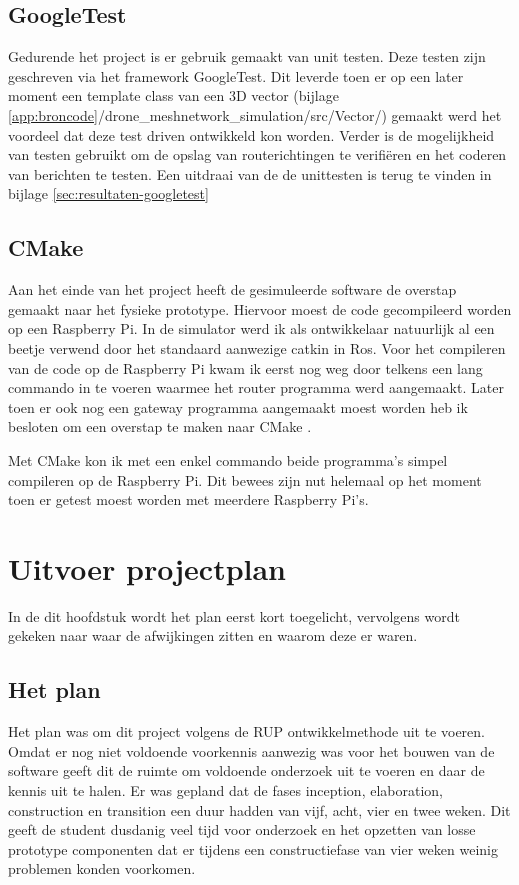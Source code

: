 \documentclass[a4paper, 11pt, oneside]{report}
\begin{document}
\section{GoogleTest}

Gedurende het project is er gebruik gemaakt van unit testen. 
Deze testen zijn geschreven via het framework GoogleTest.
Dit leverde toen er op een later moment een template class van een 3D vector (bijlage \ref{app:broncode}/drone\_meshnetwork\_simulation/src/Vector/) gemaakt werd het voordeel dat deze test driven ontwikkeld kon worden.  
Verder is de mogelijkheid van testen gebruikt om de opslag van routerichtingen te verifiëren en het coderen van berichten te testen.
Een uitdraai van de de unittesten is terug te vinden in bijlage \ref{sec:resultaten-googletest}

\section{CMake}
Aan het einde van het project heeft de gesimuleerde software de overstap gemaakt naar het fysieke prototype. 
Hiervoor moest de code gecompileerd worden op een Raspberry Pi.
In de simulator werd ik als ontwikkelaar natuurlijk al een beetje verwend door het standaard aanwezige catkin  in Ros.
Voor het compileren van de code op de Raspberry Pi kwam ik eerst nog weg door telkens een lang commando in te voeren waarmee het router programma werd aangemaakt.
Later toen er ook nog een gateway programma aangemaakt moest worden heb ik besloten om een overstap te maken naar CMake \cite{cmake}.

Met CMake kon ik met een enkel commando beide programma's simpel compileren op de Raspberry Pi.
Dit bewees zijn nut helemaal op het moment toen er getest moest worden met meerdere Raspberry Pi's.

\chapter{Uitvoer projectplan}\label{sec:uitvoer-projectplan}
In de dit hoofdstuk wordt het plan eerst kort toegelicht, vervolgens wordt gekeken naar waar de afwijkingen zitten en waarom deze er waren.



\section{Het plan}\label{sec:het-plan}
Het plan was om dit project volgens de RUP ontwikkelmethode uit te voeren. 
Omdat er nog niet voldoende voorkennis aanwezig was voor het bouwen van de software geeft dit de ruimte om voldoende onderzoek uit te voeren en daar de kennis uit te halen. 
Er was gepland dat de fases inception, elaboration, construction en transition een duur hadden van vijf, acht, vier en twee weken. 
Dit geeft de student dusdanig veel tijd voor onderzoek en het opzetten van losse prototype componenten dat er tijdens een constructiefase van vier weken weinig problemen konden voorkomen. 
\end{document}

